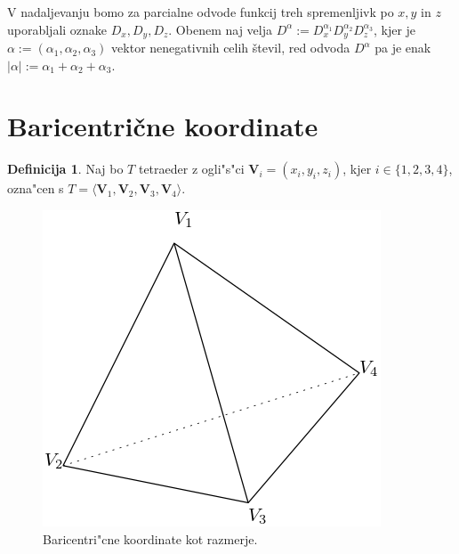 \documentclass[12pt,a4paper]{amsart}
\theoremstyle{definition} %
\newtheorem{definicija}{Definicija}[section]
\theoremstyle{plain} %
\begin{document}
V nadaljevanju bomo za parcialne odvode funkcij treh spremenljivk po 
$x,y$ in $z$ uporabljali oznake $D_x,D_y,D_z$.
Obenem naj velja $D^\alpha := D^{\alpha_1}_xD^{\alpha_2}_yD^{\alpha_3}_z$,
kjer je $\alpha := (\alpha_1,\alpha_2,\alpha_3)$ vektor nenegativnih 
celih števil, red odvoda $D^{\alpha}$ pa je enak $|\alpha| := \alpha_1+\alpha_2+\alpha_3$.\\


\section{Baricentrične koordinate}

\begin{definicija}
  Naj bo $T$ tetraeder z ogli"s"ci $\textbf{V}_{i} = (x_{i}, y_{i}, z_{i})$, kjer $i \in \{1, 2, 3, 4\}$, ozna"cen s
  $T = \langle\textbf{V}_{1}, \textbf{V}_{2}, \textbf{V}_{3}, \textbf{V}_{4}\rangle.$
  
  \begin{figure}[h!]
    \centering
    \includegraphics[scale=0.4]{tetraedar}
    \caption{Baricentri"cne koordinate kot razmerje.}
    \label{fig:tetraedar}
  \end{figure}
\end{definicija}
\end{document}
